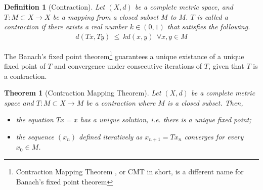 \documentclass[10pt]{article}
\numberwithin{equation}{section}
\newtheorem{theorem}{Theorem}
\newtheorem{definition}{Definition}
\numberwithin{theorem}{section}
\numberwithin{proposition}{section}
\numberwithin{lemma}{section}
\numberwithin{corollary}{section}
\numberwithin{remark}{section}
\numberwithin{definition}{section}
\numberwithin{example}{section}
\numberwithin{conjecture}{section}
\numberwithin{question}{section}
\begin{document}
\begin{definition}[Contraction]
    Let $(X, d)$ be a complete metric space, and $T:M \subset X \rightarrow X$ 
    be a mapping from a closed subset $M$ to $M$. $T $ is called a contraction 
    if there exists a real number $k \in (0, 1)$ that satisfies the following. 
    \begin{align}
        d(Tx, Ty) \ \leq \ kd(x, y) \ \ \forall x, y \in M
    \end{align}
\end{definition}

The Banach's fixed point theorem\footnote{Contraction Mapping Theorem 
, or CMT in short, is a different name for Banach's fixed point theorem} guarantees a unique existance of 
a unique fixed point of $T$ and convergence under consecutive 
iterations of $T$, given that $T$ is a contraction. 

\begin{theorem}[Contraction Mapping Theorem]
    Let $(X, d)$ be a complete metric space and $T:M \subset X \rightarrow M$ 
    be a contraction where $M$ is a closed subset. Then, 
    \begin{itemize}
        \item the equation $Tx = x$ has a unique solution, i.e. there is a unique fixed point;
        \item the sequence $(x_n)$ defined iteratively as $x_{n + 1} = Tx_n$ converges for every $x_0 \in M$. 
    \end{itemize}
\end{theorem}
\end{document}
